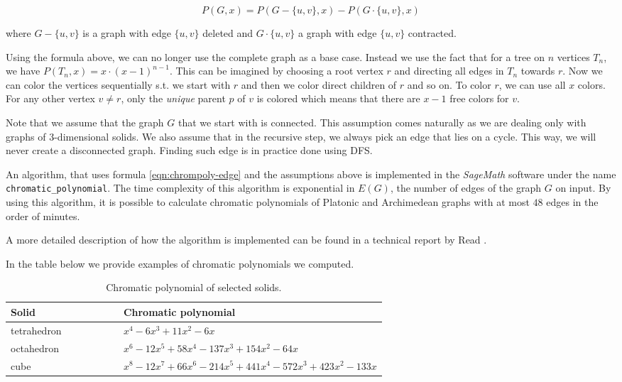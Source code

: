 \begin{equation}\label{eqn:chrompoly-edge}
    P(G,x) = P(G - \{u,v\},x) - P(G \cdot \{u,v\},x)
\end{equation}

where $G - \{u,v\}$ is a graph with edge $\{u,v\}$ deleted and $G \cdot \{u,v\}$ a graph with edge $\{u,v\}$ contracted. 

Using the formula above, we can no longer use the complete graph as a base case. Instead we use the fact that for a tree on $n$ vertices $T_n$, we have $P(T_n,x) = x \cdot (x-1)^{n-1}$. This can be imagined by choosing a root vertex $r$ and directing all edges in $T_n$ towards $r$. Now we can color the vertices sequentially s.t. we start with $r$ and then we color direct children of $r$ and so on. To color $r$, we can use all $x$ colors. For any other vertex $v \neq r$, only the \textit{unique} parent $p$ of $v$ is colored which means that there are $x-1$ free colors for $v$. 

Note that we assume that the graph $G$ that we start with is connected. This assumption comes naturally as we are dealing only with graphs of 3-dimensional solids. We also assume that in the recursive step, we always pick an edge that lies on a cycle. This way, we will never create a disconnected graph. Finding such edge is in practice done using DFS.


An algorithm, that uses formula \ref{eqn:chrompoly-edge} and the assumptions above is implemented in the \textit{SageMath} \cite{sagemath} software under the name \verb|chromatic_polynomial|. The time complexity of this algorithm is exponential in $E(G)$, the number of edges of the graph $G$ on input. By using this algorithm, it is possible to calculate chromatic polynomials of Platonic and Archimedean graphs with at most $48$ edges in the order of minutes.

A more detailed description of how the algorithm is implemented can be found in a technical report by Read \cite{read1987chromatic}.

In the table below we provide examples of chromatic polynomials we computed.

\begin{table}[H]
\centering
\begin{tabular}{lp{0.7\linewidth}}
\toprule
\textbf{Solid} & \textbf{Chromatic polynomial} \\
\midrule
tetrahedron & $x^{4} - 6x^{3} + 11x^{2} - 6x$ \\
octahedron & $x^{6} - 12x^{5} + 58x^{4} - 137x^{3} + 154x^{2} - 64x$ \\
cube & $x^{8} - 12x^{7} + 66x^{6} - 214x^{5} + 441x^{4} - 572x^{3} + 423x^{2} - 133x$ \\
\bottomrule
\end{tabular}
\caption{Chromatic polynomial of selected solids.}
\label{tab:selected-chrom-polys}
\end{table}

